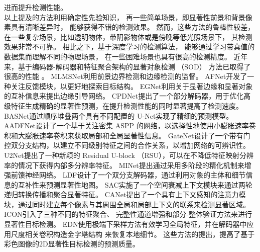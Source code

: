 进而提升检测性能。
\\
%
%
%
%
\indent
以上提及的方法利用确定性先验知识，
再一些简单场景，即显著性前景和背景像素具有清晰差异时，
能够获得不错的检测效果。
然而，这些方法的鲁棒性较差，
在一些复杂场景，比如透明物体，带阴影物体或是傍晚等低光照场景下，
其检测效果非常不可靠。
相比之下，基于深度学习的检测算法，
能够通过学习带真值的数据集而理解不同的物理场景，
在一些困难场景也具有很高的检测精度。
近年来，基于编码器-解码器和特征聚合架构的显著对象检测
（SOD）
方法已取得了很高的性能
。
MLMSNet利用前景边界检测和边缘检测的监督。
AFNet开发了一种关注反馈模块，以更好地探索目标结构。
EGNet利用关于显著边缘和显著对象的互补信息来提出边缘引导网络。
CPDNet提出了一个部分解码器，用于优化高级特征生成精确的显著性预测，在提升检测性能的同时显著提高了检测速度。
BASNet通过顺序堆叠两个具有不同配置的
U-Net实现了精细的预测模型。
AADFNet设计了一个基于关注密集 ASPP 的网络，以选择性地使用小膨胀速率卷积和大膨胀速率卷积来获取局部和全局显著性信息。
GateNet设计了一个带有门控双分支结构，以建立不同级别特征之间的合作关系，以增加网络的可辨识性。
U2Net提出了一种新颖的 Residual U-block （RSU），可以在不降低特征映射分辨率的情况下获得内部多分辨率特征。
MINet提出通过采用多阶段的精化机制来增强前馈神经网络。
LDF设计了一个双分支解码器，通过利用对象的主体和细节信息的互补性来预测显著性地图。
SAC实施了一个空间衰减上下文模块来通过两轮递归转换传播和聚合显著特征。
CANet提出了一个具有上下文感知的注意力模块，通过同时建立每个像素与其周围全局和局部上下文的联系来检测显著区域。
ICON引入了三种不同的特征聚合、
完整性通道增强和部分-整体验证方法来进行显著性目标检测。
EDN使用极端下采样方法有效学习全局特征，并在解码器中应用尺度相关卷积构造金字塔结构 
来恢复本地细节。
这些方法的提出，提高了基于彩色图像的2D显著性目标检测的预测质量。
